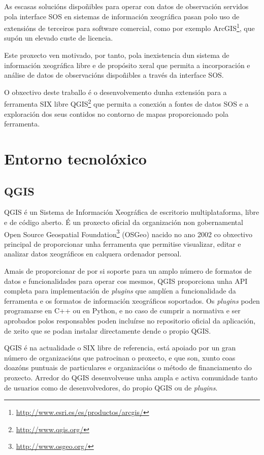 As escasas solucións dispoñibles para operar con datos de observación servidos pola interface SOS en sistemas de información xeográfica pasan polo uso de extensións de terceiros para software comercial, como por exemplo ArcGIS\footnote{\url{http://www.esri.es/es/productos/arcgis/}}, que supón un elevado custe de licencia.

Este proxecto ven motivado, por tanto, pola inexistencia dun sistema de información xeográfica libre e de propósito xeral que permita a incorporación e análise de datos de observacións dispoñibles a través da interface SOS.

O obxectivo deste traballo é o desenvolvemento dunha extensión para a ferramenta SIX libre QGIS\footnote{\url{http://www.qgis.org/}} que permita a conexión a fontes de datos SOS e a exploración dos seus contidos no contorno de mapas proporcionado pola ferramenta.

\section{Entorno tecnolóxico}
\subsection{QGIS}
QGIS é un Sistema de Información Xeográfica de escritorio multiplataforma, libre e de código aberto. É un proxecto oficial da organización non gobernamental Open Source Geospatial Foundation\footnote{\url{http://www.osgeo.org/}} (OSGeo) nacido no ano 2002 co obxectivo principal de proporcionar unha ferramenta que permitise visualizar, editar e analizar datos xeográficos en calquera ordenador persoal.

Amais de proporcionar de por si soporte para un amplo número de formatos de datos e funcionalidades para operar cos mesmos, QGIS proporciona unha API completa para implementación de \emph{plugins} que amplíen a funcionalidade da ferramenta e os formatos de información xeográficos soportados. Os \emph{plugins} poden programarse en C++ ou en Python, e no caso de cumprir a normativa e ser aprobados polos responsables poden incluírse no repositorio oficial da aplicación, de xeito que se podan instalar directamente dende o propio QGIS.

QGIS é na actualidade o SIX libre de referencia, está apoiado por un gran número de organizacións que patrocinan o proxecto, e que son, xunto coas doazóns puntuais de particulares e organizacións o método de financiamento do proxecto. Arredor do QGIS desenvolveuse unha ampla e activa comunidade tanto de usuarios como de desenvolvedores, do propio QGIS ou de \emph{plugins}.


